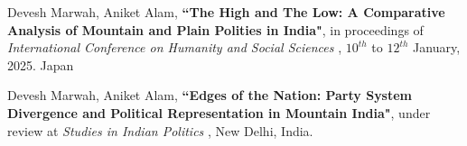 
\begin{enumerate}[label={[P\arabic*]}]  
    \item Devesh Marwah, Aniket Alam, \textbf{``The High and The Low: A Comparative Analysis of Mountain and Plain Polities in India"}, in proceedings of {\it International Conference on Humanity and Social Sciences }  , $10^{th}$ to $12^{th}$ January, 2025. Japan
    
    
    \item Devesh Marwah, Aniket Alam, \textbf{``Edges of the Nation: Party System Divergence and Political Representation in Mountain India"}, under review at {\it Studies in Indian Politics }, New Delhi, India. 
    
\end{enumerate}
